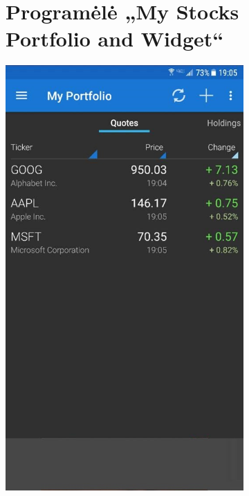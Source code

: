 \documentclass[a4paper,12pt,fleqn]{article}
\begin{document}
%
\makeatletter
\setlength{\@fptop}{0pt}
\makeatother
%
\begin{appendices}
\begin{figure}[h]
	\centering
	\begin{subfigure}{0.5\textwidth}
		\centering
		\tocless\section{Programėlė „My Stocks Portfolio and Widget“}
		\includegraphics[scale=0.532]{priedas1.jpg}

\end{subfigure}
\end{figure}
\end{appendices}
\end{document}

